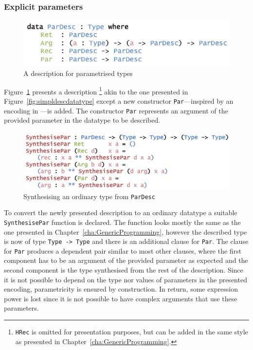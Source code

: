 \documentclass{ituthesis}
\newcommand{\ttconstructor}[1]{\textcolor{constructor-color}{\texttt{#1}}}
\newcommand{\tttype}[1]{\textcolor{type-color}{\texttt{#1}}}
\newcommand{\ttdec}[1]{\textcolor{declared-var-color}{\texttt{#1}}}
\theoremstyle{break}
\begin{document}
\subsubsection{Explicit parameters}
\label{ssub:Explicit parameters}

\begin{figure}[ht]
\begin{center}
    \includegraphics[scale=0.5]{Figures/ParDescriptionType.png}
\end{center}
\caption{A description for parametrised types}
\label{fig:pardesc}
\end{figure}

Figure~\ref{fig:pardesc} presents a description
\footnote{\ttconstructor{HRec} is omitted for presentation purposes, but can be added in the same style as presented in Chapter~\ref{cha:GenericProgramming}.}
akin to the one presented in Figure~\ref{fig:simpldescdatatype}
except a new constructor \ttconstructor{Par}---inspired by an encoding in \textcite{benke2003universes}---is added.
The constructor \ttconstructor{Par} represents an argument of the provided parameter in the datatype to be described.

\begin{figure}[ht]
\begin{center}
    \includegraphics[scale=0.5]{Figures/ParSynthesising.png}
\end{center}
\caption{Synthesising an ordinary type from \tttype{ParDesc}}
\label{fig:parsynth}
\end{figure}

To convert the newly presented description to an ordinary datatype a suitable \ttdec{SynthesisePar} function is declared.
The function looks mostly the same as the one presented in Chapter~\ref{cha:GenericProgramming}, however the described type is now of type \tttype{Type}\texttt{ -> }\tttype{Type}
and there is an additional clause for \ttconstructor{Par}.
The clause for \ttconstructor{Par} produces a dependent pair similar to most other clauses, where the first component has to be an argument of the provided parameter as expected
and the second component is the type synthesised from the rest of the description.
Since it is not possible to depend on the type nor values of parameters in the presented encoding, parametricity is ensured by construction.
In return, some expression power is lost since it is not possible to have complex arguments that use these parameters.
\end{document}
